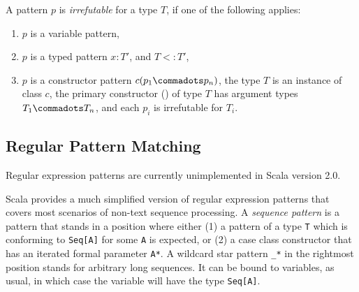 A pattern $p$ is {\em irrefutable} for a type $T$, if one of the following applies:
\begin{enumerate}
\item $p$ is a variable pattern,
\item $p$ is a typed pattern $x: T'$, and $T <: T'$,
\item $p$ is a constructor pattern $c(p_1 \commadots p_n)$, the type $T$
      is an instance of class $c$, the primary constructor
      () of type $T$ has
      argument types $T_1 \commadots T_n$, and each $p_i$ is irrefutable for $T_i$.
\end{enumerate}


\subsection{Regular Pattern Matching}\label{sec:reg-pats}

Regular expression patterns are currently unimplemented in Scala  version 2.0.

Scala provides a much simplified version of regular expression patterns that 
covers most scenarios of non-text sequence processing.
A {\em sequence pattern} is a pattern that stands in a position where
either (1) a pattern of a type \lstinline+T+ which is conforming to \lstinline+Seq[A]+ for some \lstinline+A+ is 
expected, or (2) a case class constructor that has an iterated formal parameter \lstinline+A*+.
A wildcard star pattern \lstinline+_*+ in the rightmost position stands for arbitrary long
sequences. It can be bound to variables, as usual, in which case the variable will have the type \lstinline+Seq[A]+.

